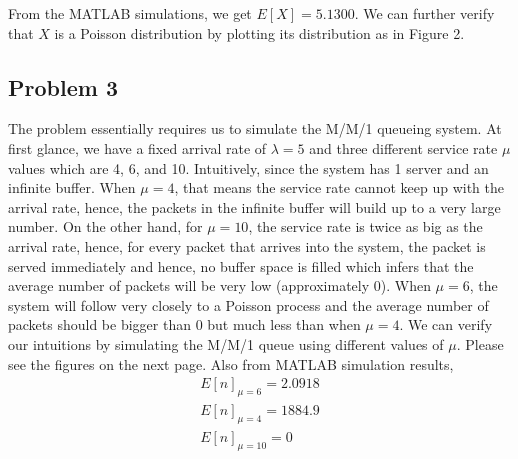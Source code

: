 \documentclass{article}
\begin{document}
		From the MATLAB simulations, we get $E[X]=5.1300$. We can further verify
		that $X$ is a Poisson distribution by plotting its distribution as in
		Figure 2.

	\subsection*{Problem 3}
		The problem essentially requires us to simulate the M/M/1 queueing system.
		At first glance, we have a fixed arrival rate of $\lambda=5$ and three
		different service rate $\mu$ values which are 4, 6, and 10. Intuitively,
		since the system has 1 server and an infinite buffer. When $\mu = 4$, that
		means the service rate cannot keep up with the arrival rate, hence, the
		packets in the infinite buffer will build up to a very large number. On the
		other hand, for $\mu = 10$, the service rate is twice as big as the arrival
		rate, hence, for every packet that arrives into the system, the packet is
		served immediately and hence, no buffer space is filled which infers that
		the average number of packets will be very low (approximately 0). When $\mu = 6$,
		the system will follow very closely to a Poisson process and the average
		number of packets should be bigger than 0 but much less than when $\mu = 4$.
		We can verify our intuitions by simulating the M/M/1 queue using different
		values of $\mu$. Please see the figures on the next page. Also from MATLAB
		simulation results,
		\begin{gather*}
			E[n]_{\mu = 6} = 2.0918 \\ 
			E[n]_{\mu = 4} = 1884.9 \\ 
			E[n]_{\mu = 10} = 0 
		\end{gather*}
\end{document}
